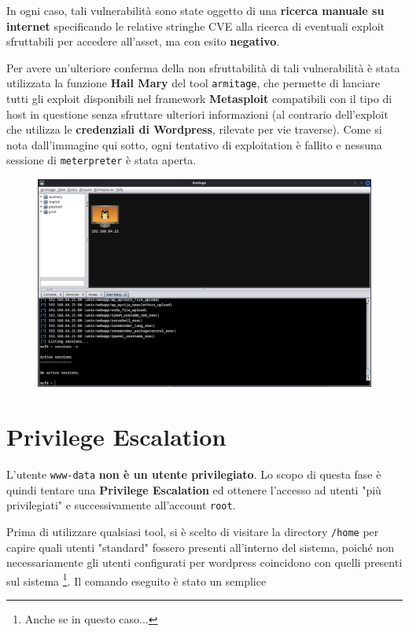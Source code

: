 \documentclass[a4paper, 12pt, oneside]{article}
\begin{document}
In ogni caso, tali vulnerabilità sono state oggetto di una \textbf{ricerca manuale su internet} specificando le relative stringhe CVE alla ricerca di eventuali exploit sfruttabili per accedere all'asset, ma con esito \textbf{negativo}.

Per avere un'ulteriore conferma della non sfruttabilità di tali vulnerabilità è stata utilizzata la funzione \textbf{Hail Mary} del tool \texttt{armitage}, che permette di lanciare tutti gli exploit disponibili nel framework \textbf{Metasploit} compatibili con il tipo di host in questione senza sfruttare ulteriori informazioni (al contrario dell'exploit che utilizza le \textbf{credenziali di Wordpress}, rilevate per vie traverse). Come si nota dall'immagine qui sotto, ogni tentativo di exploitation è fallito e nessuna sessione di \texttt{meterpreter} è stata aperta.

\begin{figure}[h!]
    \centering
    \includegraphics[width=\textwidth]{img/armitage.png}
\end{figure}

\newpage

\section{Privilege Escalation}
L'utente \texttt{www-data} \textbf{non è un utente privilegiato}. Lo scopo di questa fase è quindi tentare una \textbf{Privilege Escalation} ed ottenere l'accesso ad utenti "più privilegiati" e successivamente all'account \texttt{root}.

Prima di utilizzare qualsiasi tool, si è scelto di visitare la directory \texttt{/home} per capire quali utenti "standard" fossero presenti all'interno del sistema, poiché non necessariamente gli utenti configurati per wordpress coincidono con quelli presenti sul sistema \footnote{Anche se in questo caso...}. Il comando eseguito è stato un semplice
\end{document}
